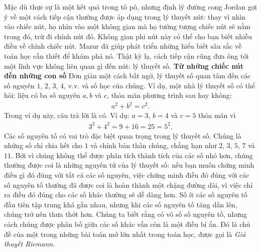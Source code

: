 \begin{multicols}{2}
	\vskip 0.05cm
	Mặc dù thực sự là một kết quả trong tô pô, nhưng định lý đường cong Jordan gợi ý về một cách tiếp cận thường được áp dụng trong lý thuyết nút: thay vì nhìn vào chiếc nút, họ nhìn vào một không gian mà họ tưởng tượng chiếc nút sẽ nằm trong đó, trừ đi chính nút đó. Không gian phi nút này có thể cho bạn biết nhiều điều về chính chiếc nút. Mazur đã giúp phát triển những hiểu biết sâu sắc về toán học cần thiết để khám phá nó. Thật kỳ lạ, cách tiếp cận cũng đưa ông tới một lĩnh vực không liên quan gì đến nút: lý thuyết số.
	\vskip 0.05cm
	\textbf{\color{duongvaotoanhoc}Từ những chiếc nút đến những con số} 
	\vskip 0.05cm
	Đơn giản một cách bất ngờ, lý thuyết số quan tâm đến các số nguyên $1$, $2$, $3$, $4$, v.v. và số học của chúng. Ví dụ, một nhà lý thuyết số có thể hỏi: liệu có ba số nguyên $a, b$ và $c$, thỏa mãn phương trình sau hay không:
	\setlength{\abovedisplayskip}{5pt}
	\setlength{\belowdisplayskip}{5pt}
	\begin{align*}
		a ^ 2 + b ^ 2 = c ^ 2. 
	\end{align*}
	Trong ví dụ này, câu trả lời là có. Ví dụ: $ a = 3 $, $ b = 4 $ và $ c = 5 $ thỏa mãn vì 
	\begin{align*}
		3 ^ 2 + 4 ^ 2 = 9 + 16 = 25 = 5 ^ 2.
	\end{align*}
	Các số nguyên tố có vai trò đặc biệt quan trọng trong lý thuyết số. Chúng là những số chỉ chia hết cho $1$ và chính bản thân chúng, chẳng hạn như $2$, $3$, $5$, $7$ và $11$. Bởi vì chúng không thể được phân tích thành tích của các số nhỏ hơn, chúng thường được coi là những nguyên tử của lý thuyết số: nếu bạn muốn chứng minh điều gì đó đúng với tất cả các số nguyên, việc chứng minh điều đó đúng với các số nguyên tố thường đã được coi là hoàn thành một chặng đường dài, vì việc chỉ ra điều đó đúng cho các số khác thường sẽ dễ dàng hơn.
	\vskip 0.05cm
	Số ít các số nguyên tố đầu tiên tập trung khá gần nhau, nhưng khi các số nguyên tố  tăng dần lên, chúng trở nên thưa thớt hơn. Chúng ta biết rằng có vô số số nguyên tố, nhưng cách chúng được phân bố giữa các số khác vẫn còn là một điều bí ẩn. Đó là chủ đề của một trong những bài toán mở lớn nhất trong toán học, được gọi là \textit{Giả thuyết Riemann}.
	\begin{figure}[H]
		\centering
		\vspace*{-5pt}
		\captionsetup{labelformat= empty, justification=centering}

\end{figure}
\end{multicols}
